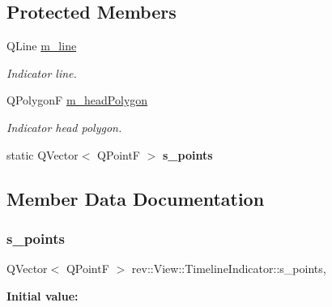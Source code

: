 \subsection*{Protected Members}
\begin{DoxyCompactItemize}
\item 
\mbox{\label{classrev_1_1_view_1_1_timeline_indicator_a03f2f25e540b6b769a1d37bf6ac33b33}} 
Q\+Line \mbox{\hyperlink{classrev_1_1_view_1_1_timeline_indicator_a03f2f25e540b6b769a1d37bf6ac33b33}{m\+\_\+line}}
\begin{DoxyCompactList}\small\item\em Indicator line. \end{DoxyCompactList}\item 
\mbox{\label{classrev_1_1_view_1_1_timeline_indicator_a2672d6055c224522969722337c76fe55}} 
Q\+PolygonF \mbox{\hyperlink{classrev_1_1_view_1_1_timeline_indicator_a2672d6055c224522969722337c76fe55}{m\+\_\+head\+Polygon}}
\begin{DoxyCompactList}\small\item\em Indicator head polygon. \end{DoxyCompactList}\item 
static Q\+Vector$<$ Q\+PointF $>$ {\bfseries s\+\_\+points}
\end{DoxyCompactItemize}


\subsection{Member Data Documentation}
\mbox{\label{classrev_1_1_view_1_1_timeline_indicator_a2b5fe2d0a941442466fc315543028e8b}} 
\subsubsection{\texorpdfstring{s\_points}{s\_points}}
{\footnotesize\ttfamily Q\+Vector$<$ Q\+PointF $>$ rev\+::\+View\+::\+Timeline\+Indicator\+::s\+\_\+points\hspace{0.3cm}{\ttfamily [static]}, {\ttfamily [protected]}}

{\bfseries Initial value\+:}
\begin{DoxyCode}{0}
\DoxyCodeLine{= \{ }
\DoxyCodeLine{\}}

\end{DoxyCode}


